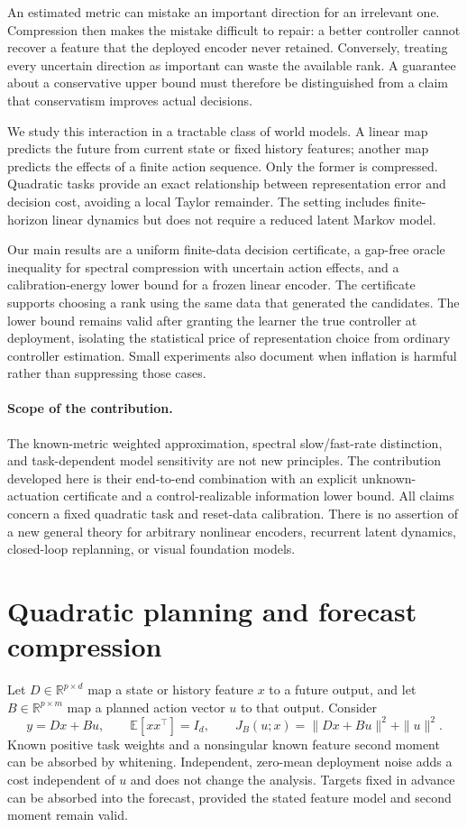 \documentclass{article}
\newcommand{\R}{\mathbb R}
\newcommand{\E}{\mathbb E}
\begin{document}
An estimated metric can mistake an important direction for an irrelevant one. Compression then makes the mistake difficult to repair: a better controller cannot recover a feature that the deployed encoder never retained. Conversely, treating every uncertain direction as important can waste the available rank. A guarantee about a conservative upper bound must therefore be distinguished from a claim that conservatism improves actual decisions.

We study this interaction in a tractable class of world models. A linear map predicts the future from current state or fixed history features; another map predicts the effects of a finite action sequence. Only the former is compressed. Quadratic tasks provide an exact relationship between representation error and decision cost, avoiding a local Taylor remainder. The setting includes finite-horizon linear dynamics but does not require a reduced latent Markov model.

Our main results are a uniform finite-data decision certificate, a gap-free oracle inequality for spectral compression with uncertain action effects, and a calibration-energy lower bound for a frozen linear encoder. The certificate supports choosing a rank using the same data that generated the candidates. The lower bound remains valid after granting the learner the true controller at deployment, isolating the statistical price of representation choice from ordinary controller estimation. Small experiments also document when inflation is harmful rather than suppressing those cases.

\paragraph{Scope of the contribution.}
The known-metric weighted approximation, spectral slow/fast-rate distinction, and task-dependent model sensitivity are not new principles. The contribution developed here is their end-to-end combination with an explicit unknown-actuation certificate and a control-realizable information lower bound. All claims concern a fixed quadratic task and reset-data calibration. There is no assertion of a new general theory for arbitrary nonlinear encoders, recurrent latent dynamics, closed-loop replanning, or visual foundation models.

\section{Quadratic planning and forecast compression}
Let $D\in\R^{p\times d}$ map a state or history feature $x$ to a future output, and let $B\in\R^{p\times m}$ map a planned action vector $u$ to that output. Consider
\begin{equation}\label{eq:setting}
 y=Dx+Bu,\qquad \E[xx^\top]=I_d,\qquad
 J_B(u;x)=\|Dx+Bu\|^2+\|u\|^2.
\end{equation}
Known positive task weights and a nonsingular known feature second moment can be absorbed by whitening. Independent, zero-mean deployment noise adds a cost independent of $u$ and does not change the analysis. Targets fixed in advance can be absorbed into the forecast, provided the stated feature model and second moment remain valid.
\end{document}
